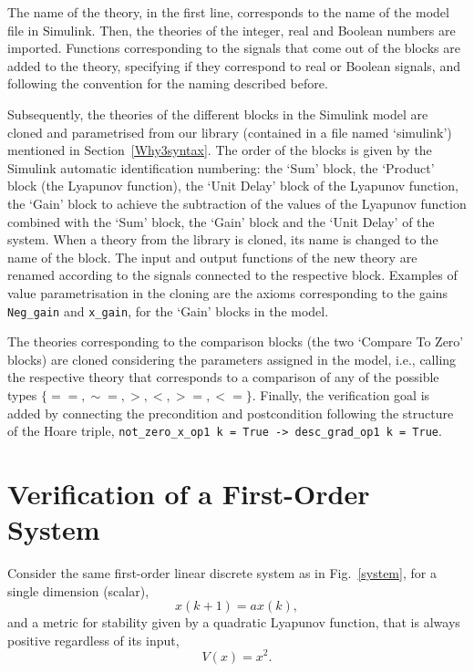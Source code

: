\documentclass[a4paper]{article}
\begin{document}
The name of the theory, in the first line, corresponds to the name of the model file in Simulink. Then, the theories of the integer, real and Boolean numbers are imported. Functions corresponding to the signals that come out of the blocks are added to the theory, specifying if they correspond to real or Boolean signals, and following the convention for the naming described before. 

Subsequently, the theories of the different blocks in the Simulink model are cloned and parametrised from our library (contained in a file named `simulink') mentioned in Section~\ref{Why3syntax}. The order of the blocks is given by the Simulink automatic identification numbering: the `Sum' block, the `Product' block (the Lyapunov function), the `Unit Delay' block of the Lyapunov function, the `Gain' block to achieve the subtraction of the values of the Lyapunov function combined with the `Sum' block, the `Gain' block and the `Unit Delay' of the system.  When a theory from the library is cloned, its name is changed to the name of the block. The input and output functions of the new theory are renamed according to the signals connected to the respective block. Examples of value parametrisation in the cloning are the axioms corresponding to the gains \verb+Neg_gain+ and \verb+x_gain+, for the `Gain' blocks in the model. 

The theories corresponding to the comparison blocks (the two `Compare To Zero' blocks) are cloned considering the parameters assigned in the model, i.e., calling the respective theory that corresponds to a comparison of any of the possible types $\{==,\sim =,>,<,>=,<=\}$. Finally, the verification goal is added by connecting the precondition and postcondition following the structure of the Hoare triple, \verb+not_zero_x_op1 k = True -> desc_grad_op1 k = True+.

\section{Verification of a First-Order System}\label{verification}

Consider the same first-order linear discrete system as in Fig.~\ref{system}, for a single dimension (scalar),
\begin{equation}
x(k+1)=ax(k),
\end{equation}
and a metric for stability given by a quadratic Lyapunov function, that is always positive regardless of its input,
\begin{equation}
V(x)=x^2.
\end{equation}
\end{document}
